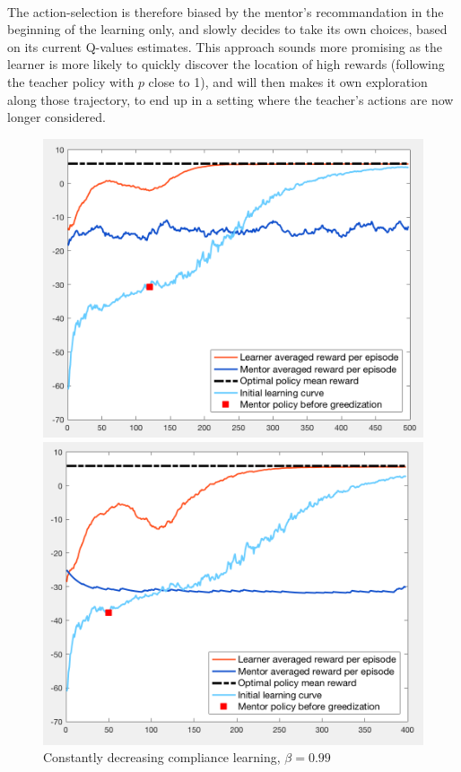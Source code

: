 \documentclass[a4paper]{report}
\begin{document}
{{{{			\paragraph{} The action-selection is therefore biased by the mentor's recommandation in the beginning of the learning only, and slowly decides to take its own choices, based on its current Q-values estimates. This approach sounds more promising as the learner is more likely to quickly discover the location of high rewards (following the teacher policy with $p$ close to 1), and will then makes it own exploration along those trajectory, to end up in a setting where the teacher's actions are now longer considered. 
		
					\begin{figure}[h!]
				\begin{minipage}{0.5\linewidth}
					\begin{center}
						\includegraphics[width=0.9\linewidth]{comp_naive_compliance_120}
						\caption{Constantly decreasing compliance learning, $\beta = 0.99$}
						\label{fig::comp_naive_compliance_120}
					\end{center}
				\end{minipage}
				\begin{minipage}{0.5\linewidth}
					\begin{center}
						\includegraphics[width=0.9\linewidth]{comp_naive_compliance_50}

\end{center}
\end{minipage}
\end{figure}}}}}
\end{document}
